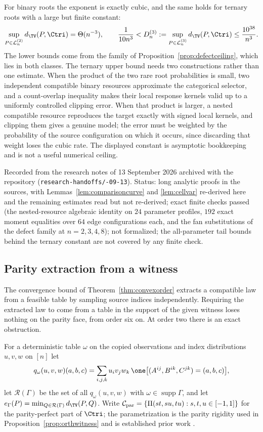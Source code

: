 For binary roots the exponent is exactly cubic, and the same holds for ternary roots with a large but finite constant:
\[
\sup_{P\in\mathcal L_n^{(2)}}d_{\TV}(P,\Ctri)=\Theta(n^{-3}),
\qquad
\frac1{10n^3}<D_n^{(3)}:=\sup_{P\in\mathcal L_n^{(3)}}d_{\TV}(P,\Ctri)\le\frac{10^{38}}{n^3}.
\]
The lower bounds come from the family of Proposition~\ref{prop:defectceiling}, which lies in both classes. The ternary upper bound needs two constructions rather than one estimate. When the product of the two rare root probabilities is small, two independent compatible binary resources approximate the categorical selector, and a count-overlap inequality makes their local response kernels valid up to a uniformly controlled clipping error. When that product is larger, a nested compatible resource reproduces the target exactly with signed local kernels, and clipping them gives a genuine model; the error must be weighted by the probability of the source configuration on which it occurs, since discarding that weight loses the cubic rate. The displayed constant is asymptotic bookkeeping and is not a useful numerical ceiling.

Recorded from the research notes of 13 September 2026 archived with the repository (\texttt{research-\allowbreak handoffs/-09-13}). Status: long analytic proofs in the sources, with Lemmas~\ref{lem:comparisoncurve} and \ref{lem:cellvar} re-derived here and the remaining estimates read but not re-derived; exact finite checks passed (the nested-resource algebraic identity on $24$ parameter profiles, $192$ exact moment equalities over $64$ edge configurations each, and the fan substitutions of the defect family at $n=2,3,4,8$); not formalized; the all-parameter tail bounds behind the ternary constant are not covered by any finite check.

\subsection*{Parity extraction from a witness}

The convergence bound of Theorem~\ref{thm:convexorder} extracts a compatible law from a feasible table by sampling source indices independently. Requiring the extracted law to come from a table in the support of the given witness loses nothing on the parity face, from order six on. At order two there is an exact obstruction.

For a deterministic table $\omega$ on the copied observations and index distributions $u,v,w$ on $[n]$ let
\[
q_\omega(u,v,w)(a,b,c)=\sum_{i,j,k}u_iv_jw_k\,\one\bigl[(A^{ij},B^{ik},C^{jk})=(a,b,c)\bigr],
\]
let $\mathcal R(\Gamma)$ be the set of all $q_\omega(u,v,w)$ with $\omega\in\operatorname{supp}\Gamma$, and let $e_\Gamma(P)=\min_{Q\in\mathcal R(\Gamma)}d_{\TV}(P,Q)$. Write $\mathcal C_{\mathrm{par}}=\{\Pi(st,su,tu):s,t,u\in[-1,1]\}$ for the parity-perfect part of $\Ctri$; the parametrization is the parity rigidity used in Proposition~\ref{prop:orthwitness} and is established prior work \cite{BoreiriEtAl2025}.

